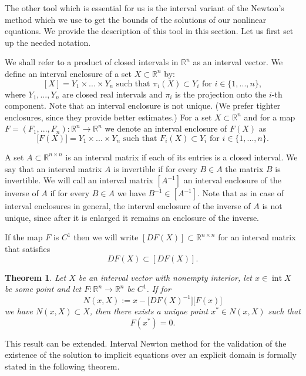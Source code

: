 \documentclass[1p]{article}
\newtheorem{theorem}{Theorem}
\DeclareMathOperator{\interior}{int}
\begin{document}
The other tool which is essential for us is the interval variant of the Newton's method which we use to get the bounds of the solutions of our nonlinear equations. We provide the description of this tool in this section. Let us first set up the needed notation.

We shall refer to a product of closed intervals in $\mathbb{R}^{n}$ as an interval vector. We define an interval enclosure of a set $X\subset\mathbb{R}^{n}$ by:
\[
    [X]=Y_{1}\times...\times Y_{n}\text{ such that }\pi_{i}(X)\subset Y_{i}\text{ for }i\in\{1,...,n\},
\]
where $Y_{1},...,Y_{n}$ are closed real intervals and $\pi_{i}$ is the projection onto the $i$-th component. Note that an interval enclosure is not unique. (We prefer tighter enclosures, since they provide better estimates.) For a set $X\subset\mathbb{R}^{n}$ and for a map $F=(F_{1},...,F_{n}):\mathbb{R}^{n}\to\mathbb{R}^{n}$ we denote an interval enclosure of $F(X)$ as
\[
    \big[F(X)\big]=Y_{1}\times...\times Y_{n}\text{ such that }F_{i}(X)\subset Y_{i}\text{ for }i\in\{1,...,n\}.
\]

A set $A\subset\mathbb{R}^{n\times n}$ is an interval matrix if each of its entries is a closed interval. We say that an interval matrix $A$ is invertible if for every $B\in A$ the matrix $B$ is invertible. We will call an interval matrix $[A^{-1}]$ an interval enclosure of the inverse of $A$ if for every $B\in A$ we have $B^{-1}\in[A^{-1}]$. Note that as in case of interval enclosures in general, the interval enclosure of the inverse of $A$ is not unique, since after it is
enlarged it remains an enclosure of the inverse.

If the map $F$ is $C^{1}$ then we will write $[DF(X)]\subset\mathbb{R}^{n\times n}$ for an interval matrix that satisfies 
\[
    DF(X)\subset[DF(X)].
\]

\begin{theorem}
    \cite{ALEFELD2000421}
    Let $X$ be an interval vector with nonempty interior, let $x\in\interior X$ be some point and let $F:\mathbb{R}^{n}\to\mathbb{R}^{n}$ be $C^{1}$. If for 
    \[
        N(x,X):=x-\big[DF(X)^{-1}\big]\big[F(x)\big]
    \]
    we have $N(x,X)\subset X$, then there exists a unique point $x^{*}\in N(x,X)$ such that 
    \[
        F(x^{*})=0.
    \]
\end{theorem}

This result can be extended. Interval Newton method for the validation of the existence of the solution to implicit equations over an explicit domain is formally stated in the following theorem.
\end{document}
